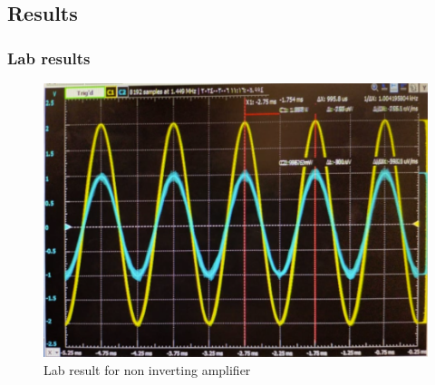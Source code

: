 \documentclass[a4paper, 12pt, english]{article}
\begin{document}
\subsection{Results}
\subsubsection{Lab results}
\begin{figure}[h]
    \centering
    \includegraphics[width=\linewidth]{images/nonInvertLab.png}
    \caption{Lab result for non inverting amplifier}
    \label{fig:Lab result for non inverting amplifier}
\end{figure}
\end{document}
